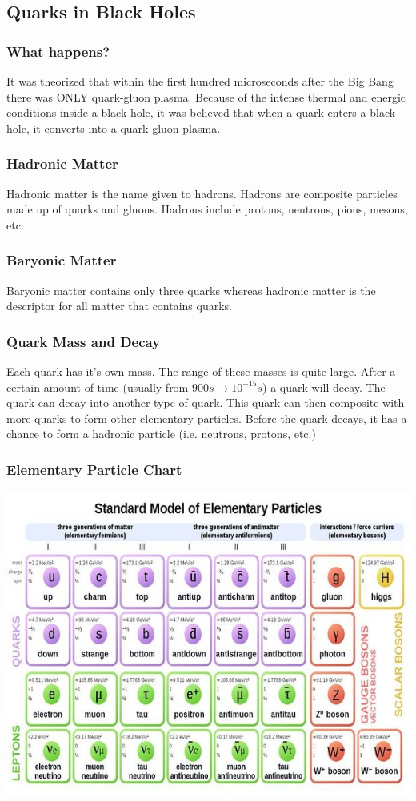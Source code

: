 \documentclass{article}
\begin{document}
\subsection{Quarks in Black Holes}
\subsubsection{What happens?}
It was theorized that within the first hundred microseconds after the Big Bang there was ONLY quark-gluon plasma. Because of the intense thermal and energic conditions inside a black hole, it was believed that when a quark enters a black hole, it converts into a quark-gluon plasma.

\subsubsection{Hadronic Matter}\label{sec:hadronicmatter}
Hadronic matter is the name given to hadrons. Hadrons are composite particles made up of quarks and gluons. Hadrons include protons, neutrons, pions, mesons, etc.

\subsubsection{Baryonic Matter}
Baryonic matter contains only three quarks whereas hadronic matter is the descriptor for all matter that contains quarks.

\subsubsection{Quark Mass and Decay}
Each quark has it's own mass. The range of these masses is quite large. After a certain amount of time (usually from $900s \to 10^{-15}s$) a quark will decay. The quark can decay into another type of quark. This quark can then composite with more quarks to form other elementary particles. Before the quark decays, it has a chance to form a hadronic particle (i.e. neutrons, protons, etc.)

\subsubsection{Elementary Particle Chart}
\includegraphics[scale=0.5]{images/elementaryparticlechart.png}
\end{document}
